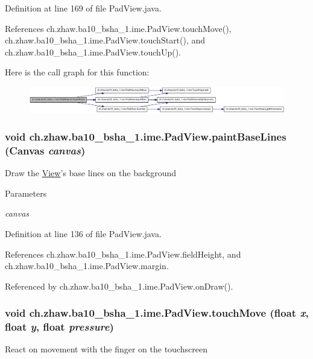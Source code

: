 Definition at line 169 of file PadView.java.

References ch.zhaw.ba10\_\-bsha\_\-1.ime.PadView.touchMove(), ch.zhaw.ba10\_\-bsha\_\-1.ime.PadView.touchStart(), and ch.zhaw.ba10\_\-bsha\_\-1.ime.PadView.touchUp().

Here is the call graph for this function:\nopagebreak
\begin{figure}[H]
\begin{center}
\leavevmode
\includegraphics[width=420pt]{classch_1_1zhaw_1_1ba10__bsha__1_1_1ime_1_1PadView_ac9247d50f73d59730a5893447aa8ca46_cgraph}
\end{center}
\end{figure}
\hypertarget{classch_1_1zhaw_1_1ba10__bsha__1_1_1ime_1_1PadView_a86b554f6a4a5fe0023b2c8bac23e32c7}{
\subsubsection[{paintBaseLines}]{\setlength{\rightskip}{0pt plus 5cm}void ch.zhaw.ba10\_\-bsha\_\-1.ime.PadView.paintBaseLines (Canvas {\em canvas})}}
\label{classch_1_1zhaw_1_1ba10__bsha__1_1_1ime_1_1PadView_a86b554f6a4a5fe0023b2c8bac23e32c7}
Draw the \hyperlink{}{View}'s base lines on the background


\begin{DoxyParams}{Parameters}
\item[{\em canvas}]\end{DoxyParams}


Definition at line 136 of file PadView.java.

References ch.zhaw.ba10\_\-bsha\_\-1.ime.PadView.fieldHeight, and ch.zhaw.ba10\_\-bsha\_\-1.ime.PadView.margin.

Referenced by ch.zhaw.ba10\_\-bsha\_\-1.ime.PadView.onDraw().\hypertarget{classch_1_1zhaw_1_1ba10__bsha__1_1_1ime_1_1PadView_a04937ec9e314a781c98cad2b080e63df}{
\subsubsection[{touchMove}]{\setlength{\rightskip}{0pt plus 5cm}void ch.zhaw.ba10\_\-bsha\_\-1.ime.PadView.touchMove (float {\em x}, \/  float {\em y}, \/  float {\em pressure})}}
\label{classch_1_1zhaw_1_1ba10__bsha__1_1_1ime_1_1PadView_a04937ec9e314a781c98cad2b080e63df}
React on movement with the finger on the touchscreen


